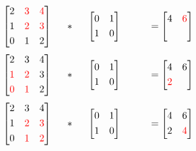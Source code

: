 \begin{multicols}{2}
\[
\begin{bmatrix}
       2 & \textcolor{red}3 & \textcolor{red}4           \\[0.3em]
       1 & \textcolor{red}2 & \textcolor{red}3 \\[0.3em]
       0 & 1 & 2
     \end{bmatrix}
\hspace*{0.5cm}
*
\hspace*{0.5cm}
\begin{bmatrix}
       0 & 1 \\[0.3em]
       1 & 0        
     \end{bmatrix}     
\hspace*{1cm}
 = \begin{bmatrix}
       4 & \textcolor{red}6 \\[0.3em]
         &         
     \end{bmatrix}
\]
\[
\begin{bmatrix}
       2 & 3 & 4           \\[0.3em]
       \textcolor{red}1 & \textcolor{red}2 & 3 \\[0.3em]
       \textcolor{red}0 & \textcolor{red}1 & 2
     \end{bmatrix}
\hspace*{0.5cm}
*
\hspace*{0.5cm}
\begin{bmatrix}
       0 & 1 \\[0.3em]
       1 & 0        
     \end{bmatrix}     
\hspace*{1cm}
 = \begin{bmatrix}
       4 & 6 \\[0.3em]
       \textcolor{red}2 &         
     \end{bmatrix}
\]
\[
\begin{bmatrix}
       2 & 3 & 4           \\[0.3em]
       1 & \textcolor{red}2 & \textcolor{red}3 \\[0.3em]
       0 & \textcolor{red}1 & \textcolor{red}2
     \end{bmatrix}
\hspace*{0.5cm}
*
\hspace*{0.5cm}
\begin{bmatrix}
       0 & 1 \\[0.3em]
       1 & 0        
     \end{bmatrix}     
\hspace*{1cm}
 = \begin{bmatrix}
       4 & 6 \\[0.3em]
       2 & \textcolor{red}4        
     \end{bmatrix}
\]


\end{multicols}
